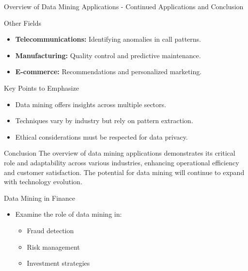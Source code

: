 \documentclass[aspectratio=169]{beamer}
\begin{document}
\begin{frame}[fragile]{Overview of Data Mining Applications - Continued Applications and Conclusion}
    \begin{block}{Other Fields}
        \begin{itemize}
            \item \textbf{Telecommunications:} Identifying anomalies in call patterns.
            \item \textbf{Manufacturing:} Quality control and predictive maintenance.
            \item \textbf{E-commerce:} Recommendations and personalized marketing.
        \end{itemize}
    \end{block}
    
    \begin{block}{Key Points to Emphasize}
        \begin{itemize}
            \item Data mining offers insights across multiple sectors.
            \item Techniques vary by industry but rely on pattern extraction.
            \item Ethical considerations must be respected for data privacy.
        \end{itemize}
    \end{block}

    \begin{block}{Conclusion}
        The overview of data mining applications demonstrates its critical role and adaptability across various industries, enhancing operational efficiency and customer satisfaction. The potential for data mining will continue to expand with technology evolution.
    \end{block}
\end{frame}

\begin{frame}{Data Mining in Finance}
    \begin{itemize}
        \item Examine the role of data mining in:
        \begin{itemize}
            \item Fraud detection
            \item Risk management
            \item Investment strategies
        \end{itemize}
    \end{itemize}
\end{frame}
\end{document}
